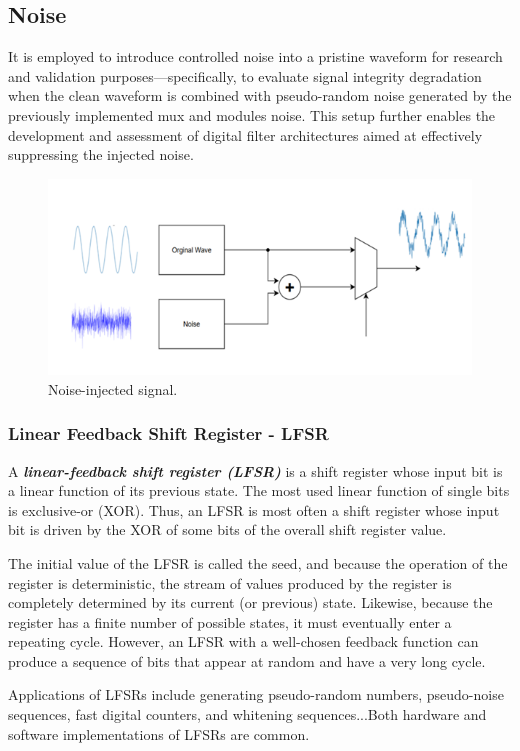 \subsection{Noise}

It is employed to introduce controlled noise into a pristine waveform for research and validation purposes—specifically, to evaluate signal integrity degradation when the clean waveform is combined with pseudo-random noise generated by the previously implemented mux and modules noise. This setup further enables the development and assessment of digital filter architectures aimed at effectively suppressing the injected noise.

\begin{figure}[H]
	\centering
	\includegraphics[width=0.7\linewidth]{./my-chapters/my-images/theoretical_background/noise_addnoise.png}
	\caption{Noise-injected signal.}
\end{figure}
\subsubsection{Linear Feedback Shift Register - LFSR}

A \textbf{\textit{linear-feedback shift register (LFSR)}} is a shift register whose input bit is a linear function of its previous state. The most used linear function of single bits is exclusive-or (XOR). Thus, an LFSR is most often a shift register whose input bit is driven by the XOR of some bits of the overall shift register value.

The initial value of the LFSR is called the seed, and because the operation of the register is deterministic, the stream of values produced by the register is completely determined by its current (or previous) state. Likewise, because the register has a finite number of possible states, it must eventually enter a repeating cycle. However, an LFSR with a well-chosen feedback function can produce a sequence of bits that appear at random and have a very long cycle.

Applications of LFSRs include generating pseudo-random numbers, pseudo-noise sequences, fast digital counters, and whitening sequences...Both hardware and software implementations of LFSRs are common.

